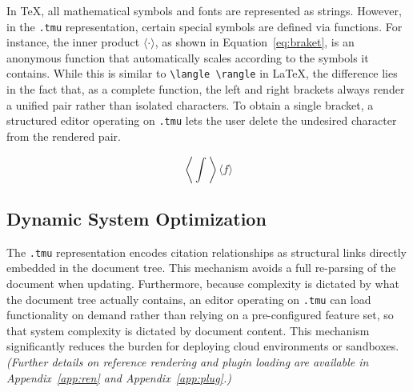 In \TeX{}, all mathematical symbols and fonts are represented as strings. However, in the \texttt{.tmu} representation, certain special symbols are defined via functions. For instance, the inner product $\langle \cdot \rangle$, as shown in Equation~\eqref{eq:braket}, is an anonymous function that automatically scales according to the symbols it contains. While this is similar to \verb|\langle \rangle| in \LaTeX{}, the difference lies in the fact that, as a complete function, the left and right brackets always render a unified pair rather than isolated characters. To obtain a single bracket, a structured editor operating on \texttt{.tmu} lets the user delete the undesired character from the rendered pair.

\begin{equation}
    \label{eq:braket}
    \left\langle \int \right\rangle \langle f \rangle
\end{equation}

\subsection{Dynamic System Optimization}

The \texttt{.tmu} representation encodes citation relationships as structural links directly embedded in the document tree. This mechanism avoids a full re-parsing of the document when updating. Furthermore, because complexity is dictated by what the document tree actually contains, an editor operating on \texttt{.tmu} can load functionality on demand rather than relying on a pre-configured feature set, so that system complexity is dictated by document content. This mechanism significantly reduces the burden for deploying cloud environments or sandboxes. \emph{(Further details on reference rendering and plugin loading are available in Appendix~\ref{app:ren} and Appendix~\ref{app:plug}.)}
